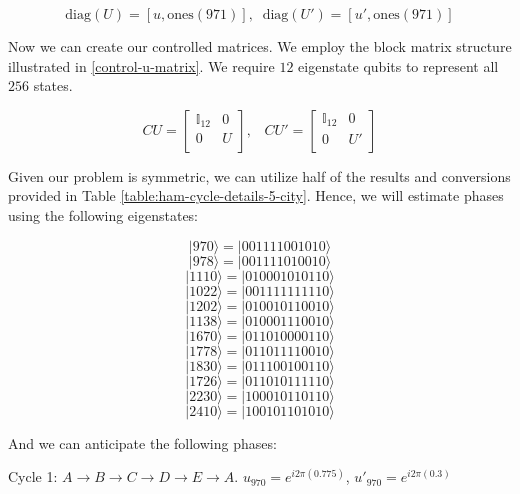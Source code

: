 \documentclass[msc,oneside]{ubcthesis}
\begin{document}
	
	\begin{equation}\label{ones}
	\mathrm{diag}(U) = [u, \mathrm{ones}(971)], \;\; \mathrm{diag}(U') = [u', \mathrm{ones}(971)]
	\end{equation}
	
	Now we can create our controlled matrices. We employ the block matrix structure illustrated in \ref{control-u-matrix}. We require $12$ eigenstate qubits to represent all $256$ states.
	
\begin{equation*}
	CU = \begin{bmatrix}
		\mathbb{I}_{12} & 0 \\
		0 & U \\
	\end{bmatrix},\;\;\;
	CU' = \begin{bmatrix}
		\mathbb{I}_{12} & 0 \\
		0 & U' \\
	\end{bmatrix}
\end{equation*}	
	
		Given our problem is symmetric, we can utilize half of the results and conversions provided in Table \ref{table:ham-cycle-details-5-city}. Hence, we will estimate phases using the following eigenstates:
	
	$$|970\rangle  = |001111001010\rangle$$
	$$|978\rangle  = |001111010010\rangle$$
	$$|1110\rangle = |010001010110\rangle$$
	$$|1022\rangle = |001111111110\rangle$$
	$$|1202\rangle = |010010110010\rangle$$
	$$|1138\rangle = |010001110010\rangle$$
	$$|1670\rangle = |011010000110\rangle$$
	$$|1778\rangle = |011011110010\rangle$$
	$$|1830\rangle = |011100100110\rangle$$
	$$|1726\rangle = |011010111110\rangle$$
	$$|2230\rangle = |100010110110\rangle$$
	$$|2410\rangle = |100101101010\rangle$$
	
	And we can anticipate the following phases:
	\clearpage
	
		Cycle 1: $A \rightarrow B \rightarrow C \rightarrow D \rightarrow E \rightarrow A$.\;\;\;\;\;\;\;\;\;\;\;\;\;\; $u_{970}  = e^{i2\pi(0.775)}$, \;\;\;\;\;$u'_{970} = e^{i2\pi(0.3)}$
		
\end{document}

